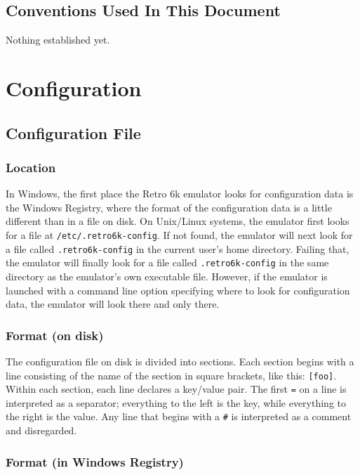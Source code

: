 \documentclass[12pt]{{memoir}}
\begin{document}
\vspace*{3in}
\section*{Conventions Used In This Document}

Nothing established yet.

\chapter{Configuration}

\section{Configuration File}
\label{sec:configfile}

\subsection{Location}
\label{ss:configloc}

In Windows, the first place the Retro 6k emulator looks for configuration data is the Windows Registry, where the format of the configuration data is a little different than in a file on disk. On Unix/Linux systems, the emulator first looks for a file at \texttt{/etc/.retro6k-config}. If not found, the emulator will next look for a file called \texttt{.retro6k-config} in the current user's home directory. Failing that, the emulator will finally look for a file called \texttt{.retro6k-config} in the same directory as the emulator's own executable file. However, if the emulator is launched with a command line option specifying where to look for configuration data, the emulator will look there and only there.

\subsection{Format (on disk)}

The configuration file on disk is divided into sections. Each section begins with a line consisting of the name of the section in square brackets, like this: \texttt{[foo]}. Within each section, each line declares a key/value pair. The first \texttt{=} on a line is interpreted as a separator; everything to the left is the key, while everything to the right is the value. Any line that begins with a \texttt{\#} is interpreted as a comment and disregarded.

\subsection{Format (in Windows Registry)}
\end{document}
